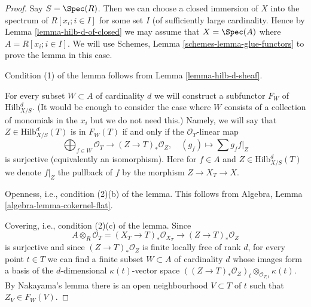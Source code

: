 \begin{proof}
Say $S = \Spec(R)$. Then we can choose a closed immersion of $X$
into the spectrum of $R[x_i; i \in I]$ for some set $I$ (of sufficiently
large cardinality. Hence by Lemma \ref{lemma-hilb-d-of-closed}
we may assume that $X = \Spec(A)$ where $A = R[x_i; i \in I]$.
We will use Schemes, Lemma \ref{schemes-lemma-glue-functors} to prove the
lemma in this case.

\medskip\noindent
Condition (1) of the lemma follows from Lemma \ref{lemma-hilb-d-sheaf}.

\medskip\noindent
For every subset $W \subset A$ of cardinality $d$ we will
construct a subfunctor $F_W$ of $\text{Hilb}^d_{X/S}$.
(It would be enough to consider the case where $W$ consists of a
collection of monomials in the $x_i$ but we do not need this.)
Namely, we will say that $Z \in \text{Hilb}^d_{X/S}(T)$ is in $F_W(T)$
if and only if the $\mathcal{O}_T$-linear map
$$
\bigoplus\nolimits_{f \in W} \mathcal{O}_T
\longrightarrow
(Z \to T)_*\mathcal{O}_Z,\quad
(g_f) \longmapsto \sum g_f f|_Z
$$
is surjective (equivalently an isomorphism). Here for $f \in A$
and $Z \in \text{Hilb}^d_{X/S}(T)$ we denote $f|_Z$ the pullback of $f$
by the morphism $Z \to X_T \to X$.

\medskip\noindent
Openness, i.e., condition (2)(b) of the lemma. This follows from
Algebra, Lemma \ref{algebra-lemma-cokernel-flat}.

\medskip\noindent
Covering, i.e., condition (2)(c) of the lemma. Since
$$
A \otimes_R \mathcal{O}_T =
(X_T \to T)_*\mathcal{O}_{X_T} \to (Z \to T)_*\mathcal{O}_Z
$$
is surjective and since $(Z \to T)_*\mathcal{O}_Z$ is finite locally
free of rank $d$, for every point $t \in T$ we can find a finite
subset $W \subset A$ of cardinality $d$ whose images form a basis
of the $d$-dimensional $\kappa(t)$-vector space
$((Z \to T)_*\mathcal{O}_Z)_t \otimes_{\mathcal{O}_{T, t}} \kappa(t)$.
By Nakayama's lemma there is an open neighbourhood $V \subset T$
of $t$ such that $Z_V \in F_W(V)$.


\end{proof}
